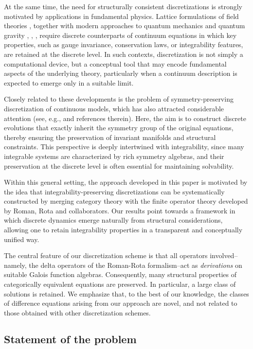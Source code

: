 \documentclass[10pt]{amsart}
\numberwithin{equation}{section}
\theoremstyle{definition}
\begin{document}
At the same time, the need for structurally consistent discretizations
is strongly motivated by applications in fundamental physics. Lattice formulations
of field theories \cite{MM}, together with modern approaches to quantum
mechanics \cite{FL} and quantum gravity \cite{ash}, \cite{thooft},
\cite{RS}, require discrete counterparts of continuum equations in which
key properties, such as gauge invariance, conservation laws, or integrability
features, are retained at the discrete level. In such contexts, discretization
is not simply a computational device, but a conceptual tool that may encode
fundamental aspects of the underlying theory, particularly when a continuum
description is expected to emerge only in a suitable limit.

Closely related to these developments is the problem of symmetry-preserving
discretization of continuous models, which has also attracted considerable
attention (see, e.g., \cite{LWYbook} and references therein). Here, the
aim is to construct discrete evolutions that exactly inherit the symmetry
group of the original equations, thereby ensuring the preservation of invariant
manifolds and structural constraints. This perspective is deeply intertwined
with integrability, since many integrable systems are characterized by
rich symmetry algebras, and their preservation at the discrete level is
often essential for maintaining solvability.

Within this general setting, the approach developed in this paper is motivated
by the idea that integrability-preserving discretizations can be systematically
constructed by merging category theory with the finite operator theory
developed by Roman, Rota and collaborators. Our results point towards a
framework in which discrete dynamics emerge naturally from structural considerations,
allowing one to retain integrability properties in a transparent and conceptually
unified way.

The central feature of our discretization scheme is that all operators
involved--namely, the delta operators of the Roman-Rota formalism--act
as \textit{derivations} on suitable Galois function algebras. Consequently,
many structural properties of categorically equivalent equations are preserved.
In particular, a large class of solutions is retained. We emphasize that, to the best of our knowledge, the classes of difference
equations arising from our approach are novel, and not related to those
obtained with other discretization schemes.

\subsection{Statement of the problem}
\label{sec1.2}
\end{document}
